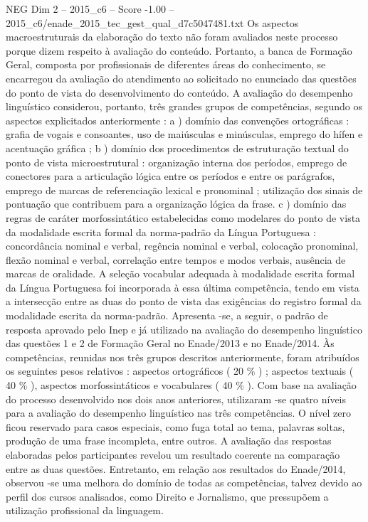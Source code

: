 \begin{textsample}{NEG Dim 2 – 2015\_c6 – Score -1.00 – 2015\_c6/enade\_2015\_tec\_gest\_qual\_d7c5047481.txt}
Os aspectos macroestruturais da elaboração do texto não foram avaliados neste processo porque dizem respeito à avaliação do conteúdo.
Portanto, a banca de Formação Geral, composta por profissionais de diferentes áreas do conhecimento, se encarregou da avaliação do atendimento ao solicitado no enunciado das questões do ponto de vista do desenvolvimento do conteúdo.
A avaliação do desempenho linguístico considerou, portanto, três grandes grupos de competências, segundo os aspectos explicitados anteriormente : a ) domínio das convenções ortográficas : grafia de vogais e consoantes, uso de maiúsculas e minúsculas, emprego do hífen e acentuação gráfica ; b ) domínio dos procedimentos de estruturação textual do ponto de vista microestrutural : organização interna dos períodos, emprego de conectores para a articulação lógica entre os períodos e entre os parágrafos, emprego de marcas de referenciação lexical e pronominal ; utilização dos sinais de pontuação que contribuem para a organização lógica da frase. c ) domínio das regras de caráter morfossintático estabelecidas como modelares do ponto de vista da modalidade escrita formal da norma-padrão da Língua Portuguesa : concordância nominal e verbal, regência nominal e verbal, colocação pronominal, flexão nominal e verbal, correlação entre tempos e modos verbais, ausência de marcas de oralidade.
A seleção vocabular adequada à modalidade escrita formal da Língua Portuguesa foi incorporada à essa última competência, tendo em vista a intersecção entre as duas do ponto de vista das exigências do registro formal da modalidade escrita da norma-padrão.
Apresenta -se, a seguir, o padrão de resposta aprovado pelo Inep e já utilizado na avaliação do desempenho linguístico das questões 1 e 2 de Formação Geral no Enade/2013 e no Enade/2014.
Às competências, reunidas nos três grupos descritos anteriormente, foram atribuídos os seguintes pesos relativos : aspectos ortográficos ( 20 \% ) ; aspectos textuais ( 40 \% ), aspectos morfossintáticos e vocabulares ( 40 \% ).
Com base na avaliação do processo desenvolvido nos dois anos anteriores, utilizaram -se quatro níveis para a avaliação do desempenho linguístico nas três competências.
O nível zero ficou reservado para casos especiais, como fuga total ao tema, palavras soltas, produção de uma frase incompleta, entre outros.
A avaliação das respostas elaboradas pelos participantes revelou um resultado coerente na comparação entre as duas questões.
Entretanto, em relação aos resultados do Enade/2014, observou -se uma melhora do domínio de todas as competências, talvez devido ao perfil dos cursos analisados, como Direito e Jornalismo, que pressupõem a utilização profissional da linguagem.

\end{textsample}
